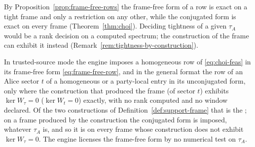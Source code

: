 
By Proposition~\ref{prop:frame-free-rows} the frame-free form of a row is
exact on a tight frame and only a restriction on any other, while the
conjugated form is exact on every frame (Theorem~\ref{thm:choi}). Deciding
tightness of a given $\tau_A$ would be a rank decision on a computed
spectrum; the construction of the frame can exhibit it instead
(Remark~\ref{rem:tightness-by-construction}).

\begin{requirement}\label{req:row-form-by-construction}
In trusted-source mode the engine imposes a homogeneous row of
\eqref{eq:choi-feas} in its frame-free form \eqref{eq:frame-free-row}, and
in the general format the row of an Alice sector $t$ of a homogeneous or a
party-local entry in its unconjugated form, only where the construction
that produced the frame (of sector $t$) exhibits $\ker W_{\tau}=0$
($\ker W_t=0$) exactly, with no rank computed and no window declared.
Of the two constructions of Definition~\ref{def:support-frame} that is the
; on a frame produced by the 
construction the conjugated form is imposed, whatever $\tau_A$ is, and so
it is on every frame whose construction does not exhibit
$\ker W_{\tau}=0$. The engine licenses the frame-free form by no numerical
test on $\tau_A$.
\end{requirement}
